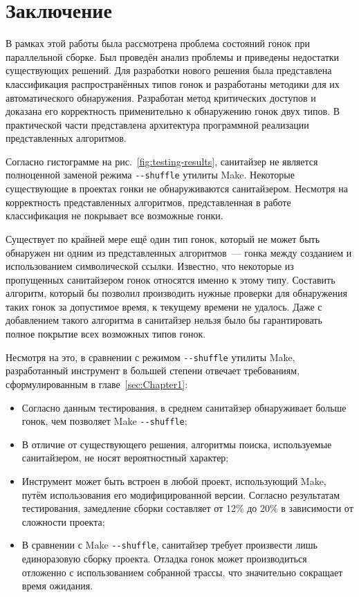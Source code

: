 \section{Заключение}
\label{sec:Chapter5} 


В рамках этой работы была рассмотрена проблема состояний гонок при параллельной сборке. Был проведён анализ проблемы и приведены недостатки существующих решений. Для разработки нового решения была представлена классификация распространённых типов гонок и разработаны методики для их автоматического обнаружения. Разработан метод критических доступов и доказана его корректность применительно к обнаружению гонок двух типов. В практической части представлена архитектура программной реализации представленных алгоритмов.

Согласно гистограмме на рис.~\ref{fig:testing-results}, санитайзер не является полноценной заменой режима \texttt{-{}-shuffle} утилиты Make. Некоторые существующие в проектах гонки не обнаруживаются санитайзером. Несмотря на корректность представленных алгоритмов, представленная в работе классификация не покрывает все возможные гонки.

Существует по крайней мере ещё один тип гонок, который не может быть обнаружен ни одним из представленных алгоритмов~--- гонка между созданием и использованием символической ссылки. Известно, что некоторые из пропущенных санитайзером гонок относятся именно к этому типу. Составить алгоритм, который бы позволил производить нужные проверки для обнаружения таких гонок за допустимое время, к текущему времени не удалось. Даже с добавлением такого алгоритма в санитайзер нельзя было бы гарантировать полное покрытие всех возможных типов гонок.

Несмотря на это, в сравнении с режимом \texttt{-{}-shuffle} утилиты Make, разработанный инструмент в большей степени отвечает требованиям, сформулированным в главе~\ref{sec:Chapter1}:

\begin{itemize}
    \item Согласно данным тестирования, в среднем санитайзер обнаруживает больше гонок, чем позволяет Make \texttt{-{}-shuffle};
    \item В отличие от существующего решения, алгоритмы поиска, используемые санитайзером, не носят вероятностный характер;
    \item Инструмент может быть встроен в любой проект, использующий Make, путём использования его модифицированной версии. Согласно результатам тестирования, замедление сборки составляет от 12\% до 20\% в зависимости от сложности проекта;
    \item В сравнении с Make \texttt{-{}-shuffle}, санитайзер требует произвести лишь единоразовую сборку проекта. Отладка гонок может производиться отложенно с использованием собранной трассы, что значительно сокращает время ожидания.
\end{itemize}

